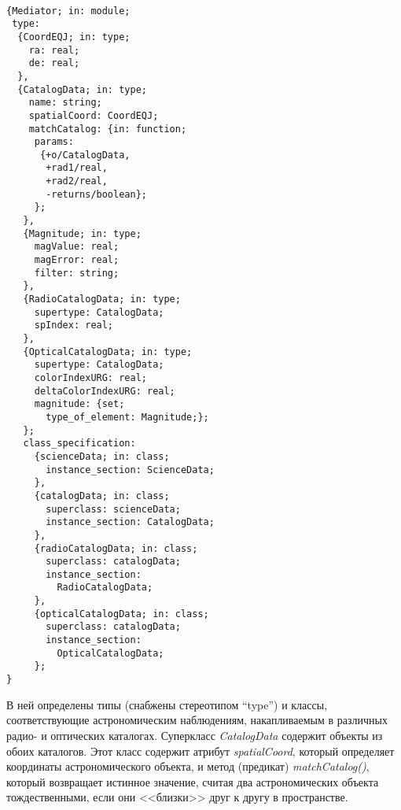 \begin{multicols}{2}
\begin{figure*} %
\vspace*{1pt}
\begin{center}
\mbox{%
\epsfxsize=125.16mm
}
\end{center}
\vspace*{-9pt}
\end{figure*}



\begin{verbatim}
{Mediator; in: module;
 type:
  {CoordEQJ; in: type;
    ra: real;
    de: real;
  },
  {CatalogData; in: type;
    name: string;
    spatialCoord: CoordEQJ;
    matchCatalog: {in: function;
     params:
      {+o/CatalogData,
       +rad1/real,
       +rad2/real,
       -returns/boolean};
     };
   },
   {Magnitude; in: type;
     magValue: real;
     magError: real;
     filter: string;
   },
   {RadioCatalogData; in: type;
     supertype: CatalogData;
     spIndex: real;
   },
   {OpticalCatalogData; in: type;
     supertype: CatalogData;
     colorIndexURG: real;
     deltaColorIndexURG: real;
     magnitude: {set;
       type_of_element: Magnitude;};
   };
   class_specification:
     {scienceData; in: class;
       instance_section: ScienceData;
     },
     {catalogData; in: class;
       superclass: scienceData;
       instance_section: CatalogData;
     },
     {radioCatalogData; in: class;
       superclass: catalogData;
       instance_section:
         RadioCatalogData;
     },
     {opticalCatalogData; in: class;
       superclass: catalogData;
       instance_section:
         OpticalCatalogData;
     };
}
\end{verbatim}

     В ней определены типы (снабжены стереотипом ``type'') и классы,
соответствующие астрономическим наблюдениям, накапливаемым в различных радио- и
оптических каталогах. Суперкласс \textit{CatalogData} содержит объекты из обоих
каталогов. Этот класс содержит атрибут \textit{spatialCoord}, который определяет
координаты астрономического объекта, и метод (предикат) \textit{matchCatalog()},
который возвращает истинное значение, считая два астрономических объекта
тождественными, если они <<близки>> друг к другу в пространстве.


\end{multicols}
